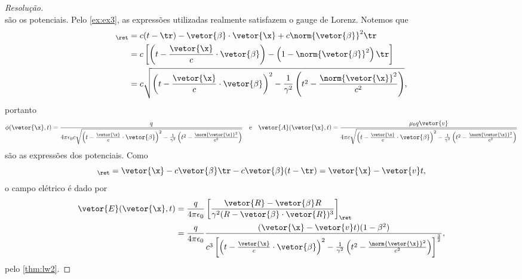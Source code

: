 \begin{proof}[Resolução]
\begin{equation*}
   \end{equation*}
   são os potenciais. Pelo \cref{ex:ex3}, as expressões utilizadas realmente satisfazem o gauge de Lorenz. Notemos que
   \begin{align*}
      [R - \vetor{\beta} \cdot \vetor{R}]_\ret &= c(t - \tr) - \vetor{\beta} \cdot \vetor{\x} + c \norm{\vetor{\beta}}^2 \tr\\
                                               &= c \left[\left(t - \frac{\vetor{\x}}{c} \cdot \vetor{\beta}\right) - \left(1 - \norm{\vetor{\beta}}^2\right)\tr\right]\\
                                               &= c \sqrt{\left(t - \frac{\vetor{\x}}{c} \cdot \vetor{\beta}\right)^2 - \frac{1}{\gamma^2}\left(t^2 - \frac{\norm{\vetor{\x}}^2}{c^2}\right)},
   \end{align*}
   portanto
   \begin{equation*}
      \phi(\vetor{\x}, t) = \frac{q}{4\pi \epsilon_0 c \sqrt{\left(t - \frac{\vetor{\x}}{c} \cdot \vetor{\beta}\right)^2 - \frac{1}{\gamma^2}\left(t^2 - \frac{\norm{\vetor{\x}}^2}{c^2}\right)}}
      \quad\text{e}\quad
      \vetor{A}(\vetor{\x},t) = \frac{\mu_0 q \vetor{v}}{4\pi c \sqrt{\left(t - \frac{\vetor{\x}}{c} \cdot \vetor{\beta}\right)^2 - \frac{1}{\gamma^2}\left(t^2 - \frac{\norm{\vetor{\x}}^2}{c^2}\right)}}
   \end{equation*}
   são as expressões dos potenciais. Como
   \begin{equation*}
      [\vetor{R} - R \vetor{\beta}]_\ret = \vetor{\x} - c\vetor{\beta} \tr - c\vetor{\beta}(t - \tr) =  \vetor{\x} - \vetor{v} t,
   \end{equation*}
   o campo elétrico é dado por
   \begin{align*}
      \vetor{E}(\vetor{\x}, t) &= \frac{q}{4\pi \epsilon_0} \left[\frac{\vetor{R} - \vetor{\beta} R}{\gamma^2 (R - \vetor{\beta} \cdot \vetor{R})^3}\right]_\ret\\
                               &= \frac{q}{4\pi \epsilon_0} 
                               \frac{(\vetor{\x} - \vetor{v} t)(1 - \beta^2)}{c^3 \left[\left(t - \frac{\vetor{\x}}{c} \cdot \vetor{\beta}\right)^2 - \frac{1}{\gamma^2}\left(t^2 - \frac{\norm{\vetor{\x}}^2}{c^2}\right)\right]^{\frac32}},
   \end{align*}
   pelo \cref{thm:lw2}.


\end{proof}
